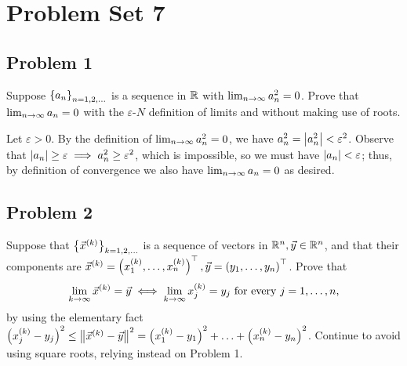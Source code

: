 \documentclass[main.tex]{subfiles}
\begin{document}
\section{Problem Set 7}
\subsection{Problem 1}
\begin{claim}
    Suppose $\left\{ a_n \right\}_{n=1,2,\ldots}$ is a sequence in $\mathbb R$ with $\lim_{n\to \infty} a^2_n = 0$. Prove that $\lim_{n\to \infty} a_n = 0$ with the $\varepsilon$-$N$ definition of limits and without making use of roots.
\end{claim}

\begin{soln}
    Let $\varepsilon > 0$. By the definition of $\lim_{n\to \infty} a^2_n = 0$, we have  $a^2_n = \left\lvert a^2_n \right\rvert < \varepsilon^2$. Observe that $\left\lvert a_n \right\rvert \ge \varepsilon\implies a^2_n \ge \varepsilon^2$, which is impossible, so we must have $\left\lvert a_n \right\rvert < \varepsilon$; thus, by definition of convergence we also have $\lim_{n\to \infty} a_n = 0$ as desired.
\end{soln}
\eject

\subsection{Problem 2}
\begin{claim}
    Suppose that $\left\{ \vec{x}^{(k)} \right\}_{k=1,2,\ldots}$ is a sequence of vectors in $\mathbb R^n, \vec{y} \in \mathbb R^n$, and that their components are $\vec{x}^{(k)} = \left( x ^{(k)}_1, \ldots , x ^{(k)}_n \right)^\top , \vec{y} = \left( y_1,\ldots ,y_n \right)^\top$. Prove that
    \[\lim_{k\to \infty} \vec{x}^{(k)} = \vec{y} \iff \lim_{k\to \infty} x ^{(k)}_j = y_j\text{ for every }j = 1,\ldots ,n,\]
    by using the elementary fact $\left( x ^{(k)}_j - y_j \right)^2 \le \left\lVert \vec{x}^{(k)} - \vec{y} \right\rVert^2 = \left( x ^{(k)}_1 - y_1 \right)^2 + \ldots + \left( x ^{(k)}_n - y_n \right)^2$. Continue to avoid using square roots, relying instead on Problem 1.
\end{claim}
\end{document}
